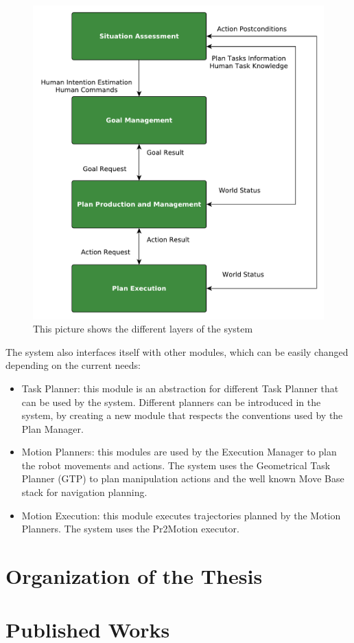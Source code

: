  \begin{figure}[h!]
	\centering
	\includegraphics[scale=0.45]{img/intro/system_architecture.pdf}
	\caption{This picture shows the different layers of the system}
	\label{fig:intro-system_architecture}
\end{figure}

The system also interfaces itself with other modules, which can be easily changed depending on the current needs:

\begin{itemize}
\item Task Planner: this module is an abstraction for different Task Planner that can be used by the system. Different planners can be introduced in the system, by creating a new module that respects the conventions used by the Plan Manager.
\item Motion Planners:  this modules are used by the Execution Manager to plan the robot movements and actions. The system uses the Geometrical Task Planner (GTP) to plan manipulation actions and the well known Move Base stack for navigation planning. 
\item Motion Execution: this module executes trajectories planned by the Motion Planners. The system uses the Pr2Motion executor.
\end{itemize}

\section{Organization of the Thesis}

\section{Published Works}